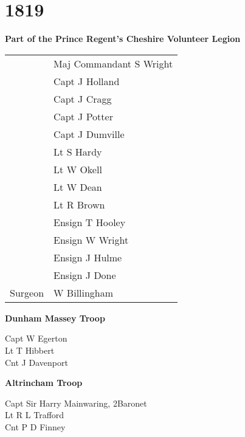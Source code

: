\chapter*{1819}

\begin{center}
  \Large
  \textbf{Part of the Prince Regent's Cheshire Volunteer Legion}
\end{center}

\begin{center}
  \begin{tabular}{rl}
    & Maj Commandant S Wright \\
    & Capt J Holland \\
    & Capt J Cragg \\
    & Capt J Potter \\
    & Capt J Dumville \\
    & Lt S Hardy \\
    & Lt W Okell \\
    & Lt W Dean \\
    & Lt R Brown \\
    & Ensign T Hooley \\
    & Ensign W Wright \\
    & Ensign J Hulme \\
    & Ensign J Done \\
    Surgeon & W Billingham \\
  \end{tabular}
\end{center}

\begin{center}
  \Large
  \textbf{Dunham Massey Troop}
\end{center}

\begin{multicols}{2}
  \noindent
  Capt W Egerton \\
  Lt T Hibbert \\
  Cnt J Davenport \\
\end{multicols}

\begin{center}
  \Large
  \textbf{Altrincham Troop}
\end{center}

\begin{multicols}{2}
  \noindent
  Capt Sir Harry Mainwaring, 2\nd Baronet \\
  Lt R L Trafford \\
  Cnt P D Finney \\
\end{multicols}
